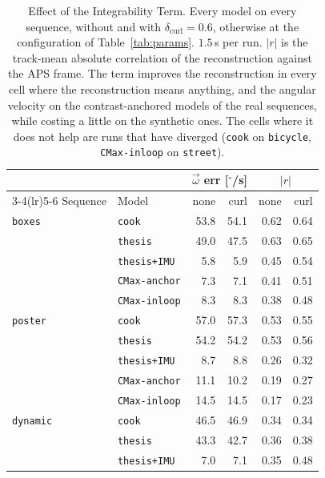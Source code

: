 \documentclass[journal]{IEEEtran}
\newcommand{\wvec}{\vec{\omega}}
\begin{document}
\begin{table}[!t]
\renewcommand{\arraystretch}{1.1}
\caption{Effect of the Integrability Term. \textnormal{Every model on every
sequence, without and with $\delta_{\text{curl}} = 0.6$, otherwise at the
configuration of Table~\ref{tab:params}. $1.5$\,s per run. $|r|$ is the
track-mean absolute correlation of the reconstruction against the APS frame. The term
improves the reconstruction in every cell where the reconstruction means
anything, and the angular velocity on the contrast-anchored models of the real
sequences, while costing a little on the synthetic ones. The cells where it
does not help are runs that have diverged (\texttt{cook} on \texttt{bicycle},
\texttt{CMax-inloop} on \texttt{street}).}}
\label{tab:curl}
\centering
\footnotesize
\begin{tabular}{@{}llrrrr@{}}
\toprule
 & & \multicolumn{2}{c}{$\wvec$ err [$^\circ$/s]} & \multicolumn{2}{c}{$|r|$} \\
\cmidrule(lr){3-4}\cmidrule(lr){5-6}
Sequence & Model & none & curl & none & curl \\
\midrule
\texttt{boxes}        & \texttt{cook}         & 53.8 & 54.1 & 0.62 & 0.64 \\
                      & \texttt{thesis}       & 49.0 & 47.5 & 0.63 & 0.65 \\
                      & \texttt{thesis+IMU}   & 5.8 & 5.9 & 0.45 & 0.54 \\
                      & \texttt{CMax-anchor}  & 7.3 & 7.1 & 0.41 & 0.51 \\
                      & \texttt{CMax-inloop}  & 8.3 & 8.3 & 0.38 & 0.48 \\
\midrule
\texttt{poster}       & \texttt{cook}         & 57.0 & 57.3 & 0.53 & 0.55 \\
                      & \texttt{thesis}       & 54.2 & 54.2 & 0.53 & 0.56 \\
                      & \texttt{thesis+IMU}   & 8.7 & 8.8 & 0.26 & 0.32 \\
                      & \texttt{CMax-anchor}  & 11.1 & 10.2 & 0.19 & 0.27 \\
                      & \texttt{CMax-inloop}  & 14.5 & 14.5 & 0.17 & 0.23 \\
\midrule
\texttt{dynamic}      & \texttt{cook}         & 46.5 & 46.9 & 0.34 & 0.34 \\
                      & \texttt{thesis}       & 43.3 & 42.7 & 0.36 & 0.38 \\
                      & \texttt{thesis+IMU}   & 7.0 & 7.1 & 0.35 & 0.48 \\

\end{tabular}
\end{table}
\end{document}
